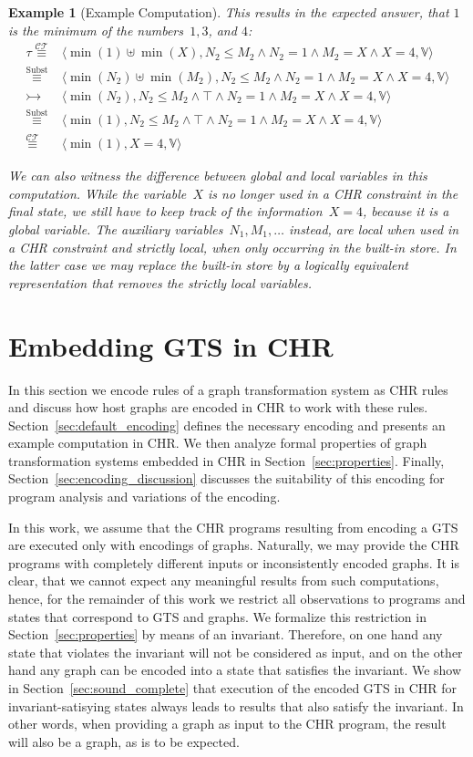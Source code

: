 \documentclass{tlp}
\newtheorem{example}{Example}[section]
\newcommand{\st}[3]{\ensuremath{\langle #1 , #2 , #3 \rangle}}
\newcommand{\CT}{\ensuremath{\mathcal{CT}}}
\newcommand{\bbV}{\ensuremath{\mathbb{V}}}
\newcommand{\der}{\ensuremath{\rightarrowtail}}
\newcommand{\eqct}{\ensuremath{\stackrel{\CT}{\equiv}}}
\newcommand{\eqsubst}{\ensuremath{\stackrel{\text{Subst}}{\equiv}}}
\begin{document}
\begin{example}[Example Computation]
This results in the expected answer, that $1$ is the minimum of the
numbers~$1,3$, and $4$:
\[
\begin{array}{cl}
\tau \eqct & \st{\min(1) \uplus \min(X)}{N_2 \le M_2 \land N_2 = 1 \land M_2
= X \land X = 4}{\bbV} \\
\eqsubst & \st{\min(N_2) \uplus \min(M_2)}{N_2 \le M_2 \land N_2 = 1 \land
M_2 = X \land X =4 }{\bbV}\\
\der & \st{\min(N_2)}{N_2 \le M_2 \land \top \land N_2 = 1 \land M_2 = X
\land X = 4}{\bbV} \\
\eqsubst & \st{\min(1)}{N_2 \le M_2 \land \top \land N_2 = 1 \land M_2 = X
\land X=4}{\bbV}\\
\eqct & \st{\min(1)}{X=4}{\bbV}
\end{array}
\]

We can also witness the difference between global and local variables in this
computation. While the variable~$X$ is no longer used in a CHR constraint in the
final state, we still have to keep track of the information~$X=4$, because it is
a global variable. The auxiliary variables~$N_1,M_1,\ldots$ instead, are local
when used in a CHR constraint and strictly local, when only occurring in the
built-in store. In the latter case we may replace the built-in store by a
logically equivalent representation that removes the strictly local variables.
\end{example}

\section{Embedding GTS in CHR}
\label{sec:encoding}

In this section we encode rules of a graph transformation system as CHR rules and
discuss how host graphs are encoded in CHR to work with these rules.
Section~\ref{sec:default_encoding}  defines the necessary encoding and presents
an example computation in CHR. We then analyze formal properties of graph
transformation systems embedded in CHR in Section~\ref{sec:properties}. Finally,
Section~\ref{sec:encoding_discussion} discusses the suitability of this encoding
for program analysis and variations of the encoding.

In this work, we assume that the CHR programs resulting from encoding a GTS are
executed only with encodings of graphs. Naturally, we may provide the CHR
programs with completely different inputs or inconsistently encoded graphs. It is
clear, that we cannot expect any meaningful results from such computations,
hence, for the remainder of this work we restrict all observations to programs
and states that correspond to GTS and graphs. We formalize this restriction in
Section~\ref{sec:properties} by means of an invariant. Therefore, on one hand any
state that violates the invariant will not be considered as input, and on the
other hand any graph can be encoded into a state that satisfies the invariant. We
show in Section~\ref{sec:sound_complete} that execution of the encoded GTS in CHR
for invariant-satisying states always leads to results that also satisfy the
invariant. In other words, when providing a graph as input to the CHR program,
the result will also be a graph, as is to be expected.
\end{document}
